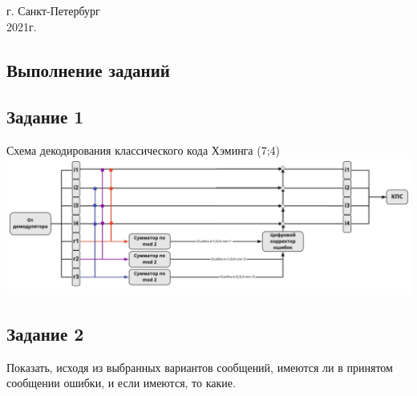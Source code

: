 \documentclass[12pt,onecolumn]{article}
\begin{document}
\vspace{10cm}
\begin{center}
    г. Санкт-Петербург\\
    2021г.
\end{center}
\newpage
\tableofcontents
\newpage
\begin{flushleft}
\section{Выполнение заданий}
\subsection{Задание 1}
Схема декодирования классического кода Хэминга (7;4)\\
\includegraphics[scale=0.17]{n1.jpg}
\subsection{Задание 2}
Показать, исходя из выбранных вариантов сообщений, имеются ли в принятом сообщении ошибки,
и если имеются, то какие.

\end{flushleft}
\end{document}
